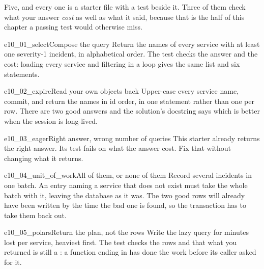 Five, and every one is a starter file with a test beside it. Three of them
check what your answer \emph{cost} as well as what it said, because that is
the half of this chapter a passing test would otherwise miss.

\begin{exercise}{e10_01_select}{Compose the query}
Return the names of every service with at least one severity-1 incident, in
alphabetical order. The test checks the answer and the cost: loading every
service and filtering in a loop gives the same list and six statements.
\end{exercise}

\begin{exercise}{e10_02_expire}{Read your own objects back}
Upper-case every service name, commit, and return the names in id order, in
one statement rather than one per row. There are two good answers and the
solution's docstring says which is better when the session is long-lived.
\end{exercise}

\begin{exercise}{e10_03_eager}{Right answer, wrong number of queries}
This starter already returns the right answer. Its test fails on what the
answer cost. Fix that without changing what it returns.
\end{exercise}

\begin{exercise}{e10_04_unit_of_work}{All of them, or none of them}
Record several incidents in one batch. An entry naming a service that does
not exist must take the whole batch with it, leaving the database as it was.
The two good rows will already have been written by the time the bad one is
found, so the transaction has to take them back out.
\end{exercise}

\begin{exercise}{e10_05_polars}{Return the plan, not the rows}
Write the lazy query for minutes lost per service, heaviest first. The test
checks the rows and that what you returned is still a : a
function ending in  has done the work before its caller
asked for it.
\end{exercise}
